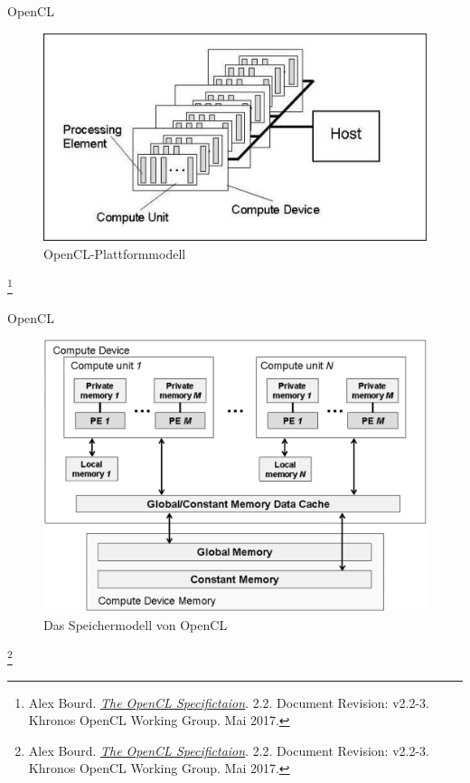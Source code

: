 \documentclass[10pt]{beamer}
\let\svthefootnote\thefootnote
\begin{document}
\begin{frame}{OpenCL}
  \begin{figure}
    \centering
    \includegraphics[width=.75\linewidth]{figures/fg-opencl-platform-model.pdf}
    \caption{OpenCL-Plattformmodell}
  \end{figure}

  \footnotesize
  \let\thefootnote\relax\footnote{Alex Bourd. \href{https://www.khronos.org/registry/OpenCL/specs/opencl-2.2.pdf}{\textit{The OpenCL Specifictaion}}. 2.2. Document Revision: v2.2-3. Khronos OpenCL Working Group. Mai 2017.}
  \addtocounter{footnote}{-1}\let\thefootnote\svthefootnote\relax
  \normalsize
\end{frame}

\begin{frame}{OpenCL}
  \begin{figure}
    \centering
    \includegraphics[width=.6\linewidth]{figures/fg-opencl-memory-model.pdf}
    \caption{Das Speichermodell von OpenCL}
  \end{figure}

  \footnotesize
  \let\thefootnote\relax\footnote{Alex Bourd. \href{https://www.khronos.org/registry/OpenCL/specs/opencl-2.2.pdf}{\textit{The OpenCL Specifictaion}}. 2.2. Document Revision: v2.2-3. Khronos OpenCL Working Group. Mai 2017.}
  \addtocounter{footnote}{-1}\let\thefootnote\svthefootnote\relax
  \normalsize
\end{frame}
\end{document}
